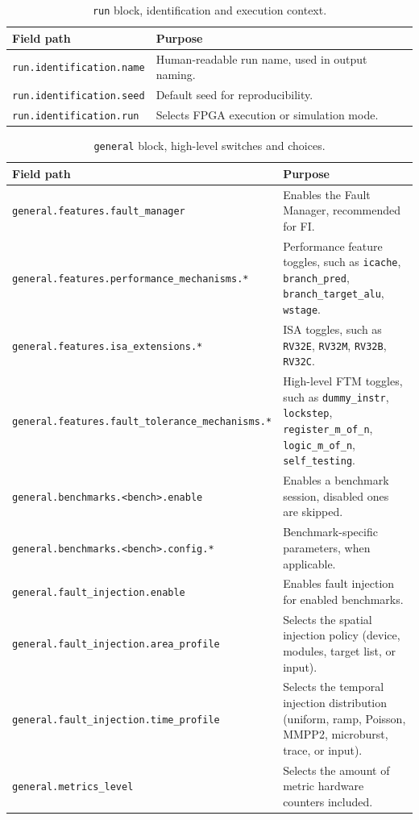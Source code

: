 \begin{table}[h]
\centering
\small
\setlength{\tabcolsep}{3.2pt}
\renewcommand{\arraystretch}{1.25}
\begin{tabularx}{\textwidth}{|l|X|}
\hline
\rowcolor{tableheader}\textbf{Field path} &
\textbf{Purpose} \\
\hline
\hline
\texttt{run.identification.name} &
Human-readable run name, used in output naming. \\
\hline
\texttt{run.identification.seed} &
Default seed for reproducibility. \\
\hline
\texttt{run.identification.run} &
Selects \ac{FPGA} execution or simulation mode. \\
\hline
\end{tabularx}
\caption{\texttt{run} block, identification and execution context.}
\label{tab:yaml_run_fields}
\end{table}

\begin{table}[h]
\centering
\small
\setlength{\tabcolsep}{3.2pt}
\renewcommand{\arraystretch}{1.25}
\begin{tabularx}{\textwidth}{|>{\raggedright\arraybackslash}p{}|X|}
\hline
\rowcolor{tableheader}\textbf{Field path} &
\textbf{Purpose} \\
\hline
\hline
\texttt{general.features.fault\_manager} &
Enables the Fault Manager, recommended for \ac{FI}. \\
\hline
\texttt{general.features.performance\_mechanisms.*} &
Performance feature toggles, such as \texttt{icache}, \texttt{branch\_pred}, \texttt{branch\_target\_alu}, \texttt{wstage}. \\
\hline
\texttt{general.features.isa\_extensions.*} &
\ac{ISA} toggles, such as \texttt{RV32E}, \texttt{RV32M}, \texttt{RV32B}, \texttt{RV32C}. \\
\hline
\texttt{general.features.fault\_tolerance\_mechanisms.*} &
High-level \ac{FTM} toggles, such as \texttt{dummy\_instr}, \texttt{lockstep}, \texttt{register\_m\_of\_n}, \texttt{logic\_m\_of\_n}, \texttt{self\_testing}. \\
\hline
\texttt{general.benchmarks.<bench>.enable} &
Enables a benchmark session, disabled ones are skipped. \\
\hline
\texttt{general.benchmarks.<bench>.config.*} &
Benchmark-specific parameters, when applicable. \\
\hline
\texttt{general.fault\_injection.enable} &
Enables fault injection for enabled benchmarks. \\
\hline
\texttt{general.fault\_injection.area\_profile} &
Selects the spatial injection policy (device, modules, target list, or input). \\
\hline
\texttt{general.fault\_injection.time\_profile} &
Selects the temporal injection distribution (uniform, ramp, Poisson, MMPP2, microburst, trace, or input). \\
\hline
\texttt{general.metrics\_level} &
Selects the amount of metric hardware counters included. \\
\hline
\end{tabularx}
\caption{\texttt{general} block, high-level switches and choices.}
\label{tab:yaml_general_fields}
\end{table}

